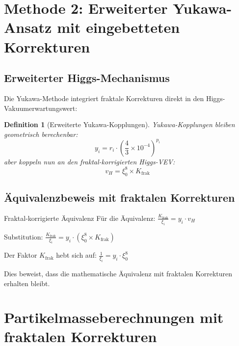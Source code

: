 \documentclass[12pt,a4paper]{article}
\newtheorem{definition}[satz]{Definition}
\begin{document}
\section{Methode 2: Erweiterter Yukawa-Ansatz mit eingebetteten Korrekturen}
\label{sec:yukawa_method_enhanced}

\subsection{Erweiterter Higgs-Mechanismus}
\label{subsec:enhanced_higgs}

Die Yukawa-Methode integriert fraktale Korrekturen direkt in den Higgs-Vakuumerwartungswert:

\begin{definition}[Erweiterte Yukawa-Kopplungen]
	Yukawa-Kopplungen bleiben geometrisch berechenbar:
	\begin{equation}
		y_i = r_i \cdot \left(\frac{4}{3} \times 10^{-4}\right)^{p_i}
		\label{eq:yukawa_couplings_enhanced}
	\end{equation}
	aber koppeln nun an den fraktal-korrigierten Higgs-VEV:
	\begin{equation}
		v_H = \xi_0^8 \times K_{\text{frak}}
		\label{eq:higgs_vev_corrected}
	\end{equation}
\end{definition}

\subsection{\"A{}quivalenzbeweis mit fraktalen Korrekturen}
\label{subsec:equivalence_proof}

\begin{schluessergebnis}{Fraktal-korrigierte \"A{}quivalenz}{}
	F\"u{}r die \"A{}quivalenz: $\frac{K_{\text{frak}}}{\xi_i} = y_i \cdot v_H$
	
	Substitution: $\frac{K_{\text{frak}}}{\xi_i} = y_i \cdot (\xi_0^8 \times K_{\text{frak}})$
	
	Der Faktor $K_{\text{frak}}$ hebt sich auf: $\frac{1}{\xi_i} = y_i \cdot \xi_0^8$
	
	Dies beweist, dass die mathematische \"A{}quivalenz mit fraktalen Korrekturen erhalten bleibt.
\end{schluessergebnis}


\section{Partikelmasseberechnungen mit fraktalen Korrekturen}
\label{sec:particle_calculations_enhanced}
\end{document}
